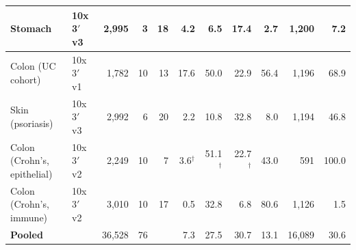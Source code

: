 \begin{table}[htbp]
\begin{tabular}{@{}llrrrrrrrrr@{}}
Stomach & 10x 3$'$ v3 & 2,995 & 3 & 18 & 4.2 & 6.5 & 17.4 & 2.7 & 1,200 & 7.2 \\
\midrule
Colon (UC cohort) & 10x 3$'$ v1 & 1,782 & 10 & 13 & 17.6 & 50.0 & 22.9 & 56.4 & 1,196 & 68.9 \\
Skin (psoriasis) & 10x 3$'$ v3 & 2,992 & 6 & 20 & 2.2 & 10.8 & 32.8 & 8.0 & 1,194 & 46.8 \\
Colon (Crohn's, epithelial) & 10x 3$'$ v2 & 2,249 & 10 & 7 & 3.6$^{\dagger}$ & 51.1$^{\dagger}$ & 22.7$^{\dagger}$ & 43.0 & 591 & 100.0 \\
Colon (Crohn's, immune) & 10x 3$'$ v2 & 3,010 & 10 & 17 & 0.5 & 32.8 & 6.8 & 80.6 & 1,126 & 1.5 \\
\midrule
\textbf{Pooled} &  & 36,528 & 76 &  & 7.3 & 27.5 & 30.7 & 13.1 & 16,089 & 30.6 \\
\bottomrule
\end{tabular}
\end{table}
